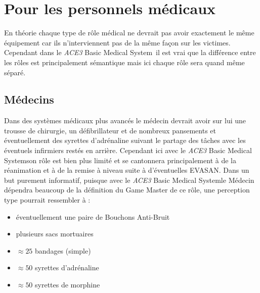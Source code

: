 \documentclass{article}
\newcommand{\medsys}{\emph{ACE3} Basic Medical System}
\begin{document}
		\section{Pour les personnels médicaux}
			En théorie chaque type de rôle médical ne devrait pas avoir exactement le même équipement car ils n'interviennent pas de la même façon sur les victimes. Cependant dans le \medsys\ il est vrai que la différence entre les rôles est principalement sémantique mais ici chaque rôle sera quand même séparé.
		
			\subsection{Médecins}
				Dans des systèmes médicaux plus avancés le médecin devrait avoir sur lui une trousse de chirurgie, un défibrillateur et de nombreux pansements et éventuellement des syrettes d'adrénaline suivant le partage des tâches avec les éventuels infirmiers restés en arrière. Cependant ici avec le \medsys son rôle est bien plus limité et se cantonnera principalement à de la réanimation et à de la remise à niveau suite à d'éventuelles EVASAN.
				Dans un but purement informatif, puisque avec le \medsys le Médecin dépendra beaucoup de la définition du Game Master de ce rôle, une perception type pourrait ressembler à :
				\begin{itemize} %
			        \item éventuellement une paire de Bouchons Anti-Bruit
					\item plusieurs sacs mortuaires
					\item $\approx25$ bandages (simple)
					\item $\approx50$ syrettes d'adrénaline
					\item $\approx50$ syrettes de morphine
				\end{itemize}
				
\end{document}
